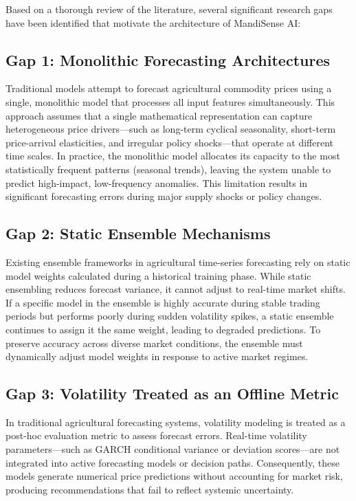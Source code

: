 \documentclass[12pt,a4paper]{report}
\theoremstyle{definition}
\theoremstyle{remark}
\begin{document}
Based on a thorough review of the literature, several significant research gaps have been identified that motivate the architecture of MandiSense AI:

\subsection{Gap 1: Monolithic Forecasting Architectures}
Traditional models attempt to forecast agricultural commodity prices using a single, monolithic model that processes all input features simultaneously. This approach assumes that a single mathematical representation can capture heterogeneous price drivers—such as long-term cyclical seasonality, short-term price-arrival elasticities, and irregular policy shocks—that operate at different time scales. In practice, the monolithic model allocates its capacity to the most statistically frequent patterns (seasonal trends), leaving the system unable to predict high-impact, low-frequency anomalies. This limitation results in significant forecasting errors during major supply shocks or policy changes.

\subsection{Gap 2: Static Ensemble Mechanisms}
Existing ensemble frameworks in agricultural time-series forecasting rely on static model weights calculated during a historical training phase. While static ensembling reduces forecast variance, it cannot adjust to real-time market shifts. If a specific model in the ensemble is highly accurate during stable trading periods but performs poorly during sudden volatility spikes, a static ensemble continues to assign it the same weight, leading to degraded predictions. To preserve accuracy across diverse market conditions, the ensemble must dynamically adjust model weights in response to active market regimes.

\subsection{Gap 3: Volatility Treated as an Offline Metric}
In traditional agricultural forecasting systems, volatility modeling is treated as a post-hoc evaluation metric to assess forecast errors. Real-time volatility parameters—such as GARCH conditional variance or deviation scores—are not integrated into active forecasting models or decision paths. Consequently, these models generate numerical price predictions without accounting for market risk, producing recommendations that fail to reflect systemic uncertainty.
\end{document}

